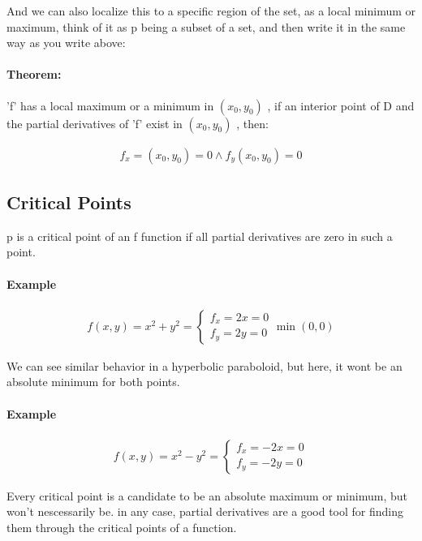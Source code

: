 \documentclass[11pt,fleqn]{book} %
\begin{document}
And we can also localize this to a specific region of the set, as a local
minimum or maximum, think of it as p being a subset of a set, and then write it
in the same way as you write above:


\paragraph{Theorem: }

'f' has a local maximum or a minimum in $(x_0, y_0)$ , 
if an interior point of D and the partial derivatives of 'f' exist in
$ (x_0, y_0) $ , then:

\begin{gather}
    f_x = (x_0, y_0) = 0 \wedge f_y(x_0, y_0) = 0
\end{gather}

\subsection{Critical Points}

p is a critical point of an f function if all partial derivatives are zero in such a point. 

\paragraph{Example}
\begin{gather}
    f(x,y) = x^2 + y^2 = \begin{cases}
        f_x = 2x = 0 \\
        f_y = 2y = 0
    \end{cases} \min(0,0)
\end{gather}

We can see similar behavior in a hyperbolic paraboloid, but here, it wont be an absolute minimum for both points.

\paragraph{Example}
\begin{gather}
    f(x,y) = x^2 - y^2 = \begin{cases}
        f_x = -2x = 0 \\
        f_y = -2y = 0
    \end{cases}
\end{gather}

Every critical point is a candidate to be an absolute maximum or minimum, but won't nescessarily be. 
in any case, partial derivatives are a good tool for finding them through the critical points of a function.
\end{document}
